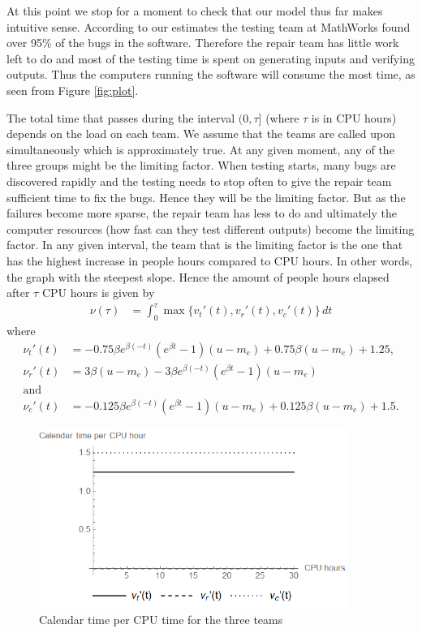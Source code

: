 At this point we stop for a moment to check that our model thus far makes intuitive sense. According to our estimates the testing team at MathWorks found over 95\% of the bugs in the software. Therefore the repair team has little work left to do and most of the testing time is spent on generating inputs and verifying outputs. Thus the computers running the software will consume the most time, as seen from Figure \ref{fig:plot}. 

The total time that passes during the interval $(0, \tau]$ (where $\tau$ is in CPU hours) depends on the load on each team. We assume that the teams are called upon simultaneously which is approximately true. At any given moment, any of the three groups might be the limiting factor. When testing starts, many bugs are discovered rapidly and the testing needs to stop often to give the repair team sufficient time to fix the bugs. Hence they will be the limiting factor. But as the failures become more sparse, the repair team has less to do and ultimately the computer resources (how fast can they test different outputs) become the limiting factor. In any given interval, the team that is the limiting factor is the one that has the highest increase in people hours compared to CPU hours. In other words, the graph with the steepest slope. Hence the amount of people hours elapsed after $\tau$ CPU hours is given by
\begin{align*}
    \nu(\tau) &= \int_0^\tau \max\{v_t'(t), v_r'(t), v_c'(t)\}\,dt
\end{align*}
where
\begin{align*}
    \nu_t'(t)&=-0.75 \beta  e^{\beta  (-t)} \left(e^{\beta  t}-1\right) \left(u-m_e\right)+0.75 \beta  \left(u-m_e\right)+1.25,\\
    \nu_r'(t)&=3 \beta  \left(u-m_e\right)-3 \beta  e^{\beta  (-t)} \left(e^{\beta  t}-1\right) \left(u-m_e\right)\\
    \text{and}\\
    \nu_c'(t)&=-0.125 \beta  e^{\beta  (-t)} \left(e^{\beta  t}-1\right) \left(u-m_e\right)+0.125 \beta  \left(u-m_e\right)+1.5.
\end{align*}

\begin{figure}
    \centering
    \includegraphics[width=10cm]{img/dplot.png}
    \caption{Calendar time per CPU time for the three teams}
    \label{fig:dplot}
\end{figure}

